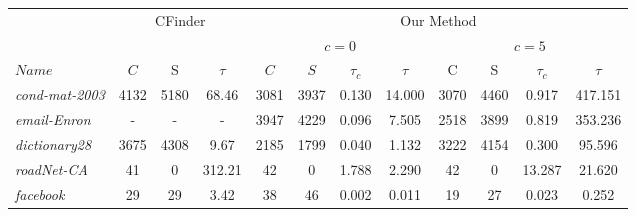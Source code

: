 \begin{table}
\begin{tabular}{ l || c c c | c c c c | c c c c }
\toprule\toprule
 					&  		\multicolumn{3}{c}{CFinder}			&		\multicolumn{8}{|c}{Our Method}			\\
 					&  		\multicolumn{3}{c}{}			&		\multicolumn{4}{|c}{$c=0$}			&	\multicolumn{4}{c}{$c=5$}		\\
\hline
$Name$				&	$C$	&	S	&$\tau$		&	$C$	&	$S$	&	$\tau_c$	&	$\tau$	&	C	&	S	&$\tau_c$		&	$\tau$	\\
\hline\hline
{\em cond-mat-2003}		&	4132	&	5180	&	68.46	&	3081	&	3937	&	0.130	&	14.000	&	3070	&	4460	&	0.917	&	417.151	\\
{\em email-Enron}		&	-	&	-	&	-		&	3947	&	4229	&	0.096	&	7.505	&	2518	&	3899	&	0.819	&	353.236	\\
{\em dictionary28}		&	3675	&	4308	&	9.67		&	2185	&	1799	&	0.040	&	1.132	&	3222	&	4154	&	0.300	&	95.596	\\
{\em roadNet-CA}		&	41	&	0	&	312.21	&	42	&	0	&	1.788	&	2.290	&	42	&	0	&	13.287	&	21.620	\\
{\em facebook}	&	29	&	29	&	3.42		&	38	&	46	&	0.002	&	0.011	&	19	&	27	&	0.023	&	0.252	\\
\bottomrule\bottomrule
\end{tabular}

\end{table}
